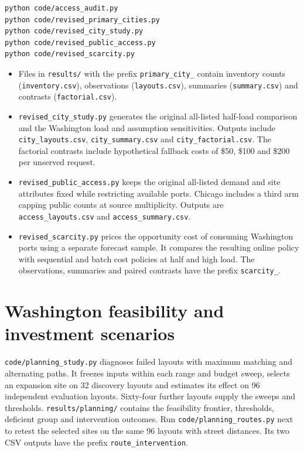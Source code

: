 \documentclass[11pt,a4paper]{article}
\begin{document}
\begin{lstlisting}
python code/access_audit.py
python code/revised_primary_cities.py
python code/revised_city_study.py
python code/revised_public_access.py
python code/revised_scarcity.py
\end{lstlisting}
\begin{itemize}
\item Files in \texttt{results/} with the prefix \texttt{primary\_city\_} contain inventory counts (\texttt{inventory.csv}), observations (\texttt{layouts.csv}), summaries (\texttt{summary.csv}) and contrasts (\texttt{factorial.csv}).
\item \texttt{revised\_city\_study.py} generates the original all-listed half-load comparison and the Washington load and assumption sensitivities. Outputs include \texttt{city\_layouts.csv}, \texttt{city\_summary.csv} and \texttt{city\_factorial.csv}. The factorial contrasts include hypothetical fallback costs of \$50, \$100 and \$200 per unserved request.
\item \texttt{revised\_public\_access.py} keeps the original all-listed demand and site attributes fixed while restricting available ports. Chicago includes a third arm capping public counts at source multiplicity. Outputs are \texttt{access\_layouts.csv} and \texttt{access\_summary.csv}.
\item \texttt{revised\_scarcity.py} prices the opportunity cost of consuming Washington ports using a separate forecast sample. It compares the resulting online policy with sequential and batch cost policies at half and high load. The observations, summaries and paired contrasts have the prefix \texttt{scarcity\_}.
\end{itemize}

\newpage
\section*{Washington feasibility and investment scenarios}
\texttt{code/planning\_study.py} diagnoses failed layouts with maximum matching and alternating paths. It freezes inputs within each range and budget sweep, selects an expansion site on 32 discovery layouts and estimates its effect on 96 independent evaluation layouts. Sixty-four further layouts supply the sweeps and thresholds.
\texttt{results/planning/} contains the feasibility frontier, thresholds, deficient group and intervention outcomes. Run \texttt{code/planning\_routes.py} next to retest the selected sites on the same 96 layouts with street distances. Its two CSV outputs have the prefix \texttt{route\_intervention}.
\end{document}
